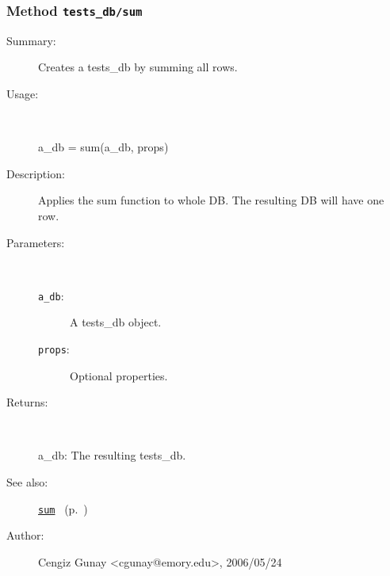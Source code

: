 \subsubsection[Method \texttt{sum}]{Method \texttt{tests\_db/sum}}%
%
\label{ref_tests_db__sum}%
\hypertarget{ref_tests_db__sum}{}%
\begin{description}
\item[Summary:]Creates a tests\_db by summing all rows.
%
\item[Usage:]~%
\begin{lyxcode}%
a\_db = sum(a\_db, props)
%
\end{lyxcode}%
%
\item[Description:]%
Applies the sum function to whole DB. The resulting DB will have one row.
\item[Parameters:]~
\begin{description}%
\item[\texttt{a\_db}:]
 A tests\_db object.
\item[\texttt{props}:]
 Optional properties.
\end{description}%
%
\item[Returns:]~

	a\_db: The resulting tests\_db.
%
%
\item[See also:]%
\hyperlink{ref_sum}{\texttt{sum}}%
\ (p.~\pageref{ref_sum})%
%
%
\item[Author:]%
Cengiz Gunay <cgunay@emory.edu>, 2006/05/24%
\end{description}
\methodline%
